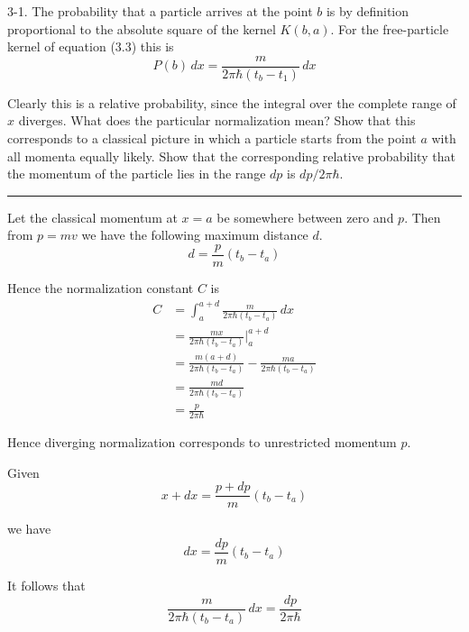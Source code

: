 \documentclass[12pt]{article}
\begin{document}
3-1.
The probability that a particle arrives at the point $b$
is by definition proportional to the absolute square of the kernel
$K(b,a)$.
For the free-particle kernel of equation (3.3) this is
\begin{equation*}
P(b)\,dx=\frac{m}{2\pi\hbar(t_b-t_1)}\,dx
\tag{3.6}
\end{equation*}

Clearly this is a relative probability, since the integral over the
complete range of $x$ diverges.
What does the particular normalization mean?
Show that this corresponds to a classical picture in which a particle
starts from the point $a$ with all momenta equally likely.
Show that the corresponding relative probability that the momentum
of the particle lies in the range $dp$ is $dp/2\pi\hbar$.

\bigskip
\hrule

\bigskip
Let the classical momentum at $x=a$ be somewhere between zero and $p$.
Then from $p=mv$ we have the following maximum distance $d$.
\begin{equation*}
d=\frac{p}{m}(t_b-t_a)
\end{equation*}

\noindent
Hence the normalization constant $C$ is
\begin{align*}
C&=\int_a^{a+d}\frac{m}{2\pi\hbar(t_b-t_a)}\,dx
\\[1ex]
&=\frac{mx}{2\pi\hbar(t_b-t_a)}\bigg|_a^{a+d}
\\[1ex]
&=\frac{m(a+d)}{2\pi\hbar(t_b-t_a)}-\frac{ma}{2\pi\hbar(t_b-t_a)}
\\[1ex]
&=\frac{md}{2\pi\hbar(t_b-t_a)}
\\[1ex]
&=\frac{p}{2\pi\hbar}
\end{align*}

\noindent
Hence diverging normalization corresponds to unrestricted momentum $p$.

\bigskip
\noindent
Given
\begin{equation*}
x+dx=\frac{p+dp}{m}(t_b-t_a)
\end{equation*}

\noindent
we have
\begin{equation*}
dx=\frac{dp}{m}(t_b-t_a)
\end{equation*}

\noindent
It follows that
\begin{equation*}
\frac{m}{2\pi\hbar(t_b-t_a)}\,dx=\frac{dp}{2\pi\hbar}
\end{equation*}
\end{document}
